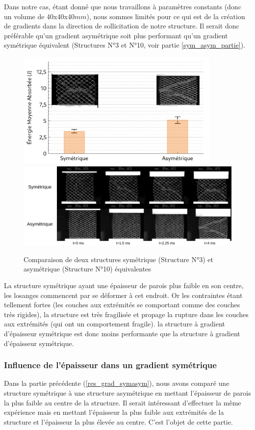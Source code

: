 \documentclass[a4paper]{article}
\begin{document}
	Dans notre cas, étant donné que nous travaillons à paramètres constants (donc un volume de 40x40x40$mm$), nous sommes limités pour ce qui est de la création de gradients dans la direction de sollicitation de notre structure. Il serait donc préférable qu'un gradient asymétrique soit plus performant qu'un gradient symétrique équivalent (Structures N°3 et N°10, voir partie \ref{sym_asym_partie}).
	
	\begin{figure}[H]
		\centering
		\includegraphics[width=10cm]{Images/7/7_4/7_4_4/comp_symasym.pdf}
		\includegraphics[width=16cm]{Images/7/7_4/7_4_4/instants.pdf}
		\caption{Comparaison de deux structures symétrique (Structure N°3) et asymétrique (Structure N°10) équivalentes}
	\end{figure}

	La structure symétrique ayant une épaisseur de parois plus faible en son centre, les losanges commencent par se déformer à cet endroit. Or les contraintes étant tellement fortes (les couches aux extrémités se comportant comme des couches très rigides), la structure est très fragilisée et propage la rupture dans les couches aux extrémités (qui ont un comportement fragile). la structure à gradient d'épaisseur symétrique est donc moins performante que la structure à gradient d'épaisseur symétrique.
	\newpage
	
	\subsubsection{Influence de l'épaisseur dans un gradient symétrique}
	\label{ep_grad_sym}
	\hspace{0.5cm}Dans la partie précédente (\ref{res_grad_symasym}), nous avons comparé une structure symétrique à une structure asymétrique en mettant l'épaisseur de parois la plus faible au centre de la structure. Il serait intéressant d'effectuer la même expérience mais en mettant l'épaisseur la plus faible aux extrémités de la structure et l'épaisseur la plus élevée au centre. C'est l'objet de cette partie.
	
\end{document}
